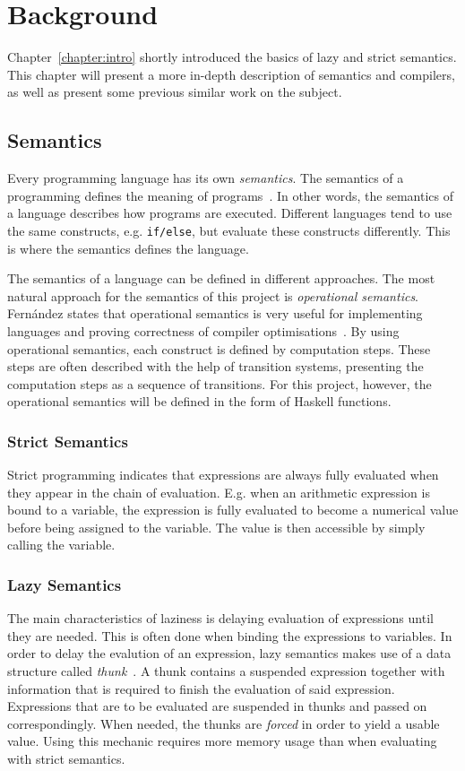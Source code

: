 \chapter{Background}
Chapter~\ref{chapter:intro} shortly introduced the basics of lazy and strict
semantics. This chapter will present a more in-depth description of semantics
and compilers, as well as present some previous similar work on the subject.

\section{Semantics}
Every programming language has its own \textit{semantics}. The semantics of a
programming defines the meaning of programs~\cite{Fernand:PLangOpSem}. In other
words, the semantics of a language describes how programs are executed.
Different languages tend to use the same constructs, e.g. \texttt{if/else}, but
evaluate these constructs differently. This is where the semantics defines the
language.

The semantics of a language can be defined in different approaches. The most
natural approach for the semantics of this project is
\textit{operational semantics}. Fernández states that operational semantics
is very useful for implementing languages and proving correctness of compiler
optimisations~\cite{Fernand:PLangOpSem}. By using operational
semantics, each construct is defined by computation steps. These steps are
often described with the help of transition systems, presenting the computation
steps as a sequence of transitions. For this project, however,
the operational semantics will be defined in the form of Haskell functions.


\subsection{Strict Semantics}
Strict programming indicates that expressions are always fully evaluated when
they appear in the chain of evaluation. E.g. when an arithmetic expression is
bound to a variable, the expression is fully evaluated to become a numerical
value before being assigned to the variable. The value is then accessible
by simply calling the variable.

\subsection{Lazy Semantics}
The main characteristics of laziness is delaying evaluation of expressions
until they are needed. This is often done when binding the expressions to
variables. In order to delay the evalution of an expression, lazy semantics
makes use of a data structure called
\textit{thunk}~\cite{Ennals:2003:OEA:944746.944731}. A thunk contains a
suspended expression together with information that is required to finish the
evaluation of said expression. Expressions that are to be
evaluated are suspended in thunks and passed on correspondingly. When needed,
the thunks are \textit{forced} in order to yield a usable value. Using this
mechanic requires more memory usage than when evaluating with strict semantics.

